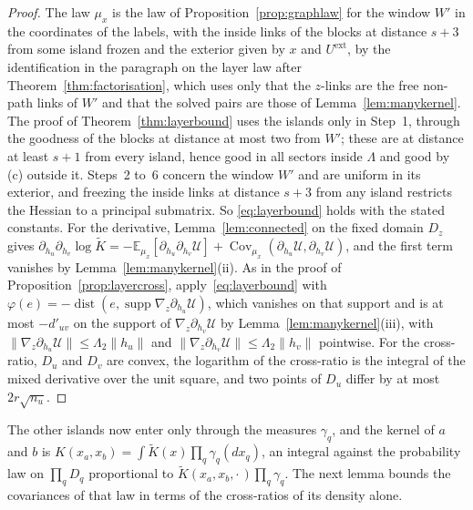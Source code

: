 \documentclass[11pt]{amsart}
\theoremstyle{definition}
\theoremstyle{remark}
\numberwithin{equation}{section}
\newcommand{\E}{\mathbb{E}}
\newcommand{\Cov}{\operatorname{Cov}}
\newcommand{\dist}{\operatorname{dist}}
\begin{document}
\begin{proof}
The law $\mu_x$ is the law of Proposition~\ref{prop:graphlaw} for the
window $W'$ in the coordinates of the labels, with the inside links of the
blocks at distance $s+3$ from some island frozen and the exterior given by
$x$ and $U^{\mathrm{ext}}$, by the identification in the paragraph on the
layer law after Theorem~\ref{thm:factorisation}, which uses only that the
$z$-links are the free non-path links of $W'$ and that the solved pairs are
those of Lemma~\ref{lem:manykernel}. The proof of
Theorem~\ref{thm:layerbound} uses the islands only in Step~1, through the
goodness of the blocks at distance at most two from $W'$; these are at
distance at least $s+1$ from every island, hence good in all sectors inside
$\Lambda$ and good by (c) outside it. Steps~2 to~6 concern the window $W'$
and are uniform in its exterior, and freezing the inside links at distance
$s+3$ from any island restricts the Hessian to a principal submatrix. So
\eqref{eq:layerbound} holds with the stated constants. For the derivative,
Lemma~\ref{lem:connected} on the fixed domain $D_z$ gives
$\partial_{h_u}\partial_{h_v}\log\tilde K=-\E_{\mu_x}[\partial_{h_u}
\partial_{h_v}\mathcal U]+\Cov_{\mu_x}(\partial_{h_u}\mathcal U,
\partial_{h_v}\mathcal U)$, and the first term vanishes by
Lemma~\ref{lem:manykernel}(ii). As in the proof of
Proposition~\ref{prop:layercross}, apply~\eqref{eq:layerbound} with
$\varphi(e)=-\dist(e,\operatorname{supp}\nabla_z\partial_{h_u}\mathcal U)$,
which vanishes on that support and is at most $-d'_{uv}$ on the support of
$\nabla_z\partial_{h_v}\mathcal U$ by Lemma~\ref{lem:manykernel}(iii), with
$\lVert\nabla_z\partial_{h_u}\mathcal U\rVert\le\Lambda_2\lVert h_u\rVert$
and $\lVert\nabla_z\partial_{h_v}\mathcal U\rVert\le\Lambda_2\lVert h_v
\rVert$ pointwise. For the cross-ratio, $D_u$ and $D_v$ are convex, the
logarithm of the cross-ratio is the integral of the mixed derivative over
the unit square, and two points of $D_u$ differ by at most $2r\sqrt{n_u}$.
\end{proof}

The other islands now enter only through the measures $\gamma_q$, and the
kernel of $a$ and $b$ is $K(x_a,x_b)=\int\tilde K(x)\prod_q\gamma_q(dx_q)$,
an integral against the probability law on $\prod_qD_q$ proportional to
$\tilde K(x_a,x_b,\cdot\,)\prod_q\gamma_q$. The next lemma bounds the
covariances of that law in terms of the cross-ratios of its density alone.
\end{document}
